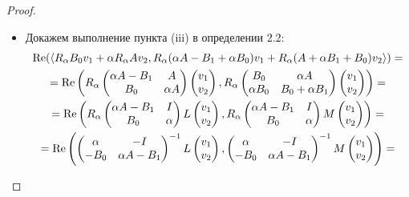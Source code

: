 \begin{proof}
\begin{itemize}
\item[(iii)] Докажем выполнение пункта (iii) в определении 2.2:
\begin{multline*}
\mathop{\rm Re}(\langle R_{\alpha} B_{0}v_{1}+\alpha R_{\alpha}Av_{2},R_{\alpha}(\alpha A-B_{1}+\alpha B_{0})v_{1}+R_{\alpha}(A+\alpha B_{1}+B_{0})v_{2}\rangle)=
\\
=\mathop{\rm Re}\left(R_{\alpha}\begin{pmatrix} \alpha A-B_{1}&A\\B_{0}&\alpha A\end{pmatrix}\begin{pmatrix} v_{1}\\v_{2}\end{pmatrix}, R_{\alpha}\begin{pmatrix} B_{0}&\alpha A\\\alpha B_{0}&B_{0}+\alpha B_{1}\end{pmatrix}\begin{pmatrix} v_{1}\\v_{2}\end{pmatrix}\right)=
\\
=\mathop{\rm Re}\left(R_{\alpha}\begin{pmatrix} \alpha A-B_{1}&I\\B_{0}&\alpha \end{pmatrix}L\begin{pmatrix} v_{1}\\v_{2}\end{pmatrix},R_{\alpha}\begin{pmatrix}\alpha A- B_{1}&I\\ B_{0}&\alpha\end{pmatrix}M\begin{pmatrix} v_{1}\\v_{2}\end{pmatrix}\right)=
\\
=\mathop{\rm Re}\left(\begin{pmatrix} \alpha &-I\\-B_{0}&\alpha A-B_{1} \end{pmatrix}^{-1}L\begin{pmatrix} v_{1}\\v_{2}\end{pmatrix}, \begin{pmatrix}\alpha&-I\\ -B_{0}&\alpha A-B_{1}\end{pmatrix}^{-1}M\begin{pmatrix} v_{1}\\v_{2}\end{pmatrix}\right)=

\end{multline*}
\end{itemize}
\end{proof}
